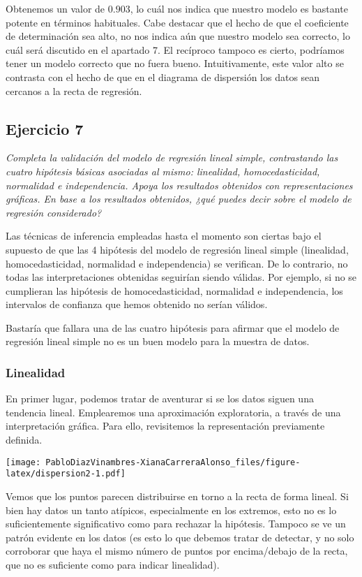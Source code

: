\documentclass[
]{article}
\begin{document}
Obtenemos un valor de \(0.903\), lo cuál nos indica que nuestro modelo
es bastante potente en términos habituales. Cabe destacar que el hecho
de que el coeficiente de determinación sea alto, no nos indica aún que
nuestro modelo sea correcto, lo cuál será discutido en el apartado 7. El
recíproco tampoco es cierto, podríamos tener un modelo correcto que no
fuera bueno. Intuitivamente, este valor alto se contrasta con el hecho
de que en el diagrama de dispersión los datos sean cercanos a la recta
de regresión.

\hypertarget{ejercicio-7}{%
\subsection{Ejercicio 7}\label{ejercicio-7}}

\textit{Completa la validación del modelo de regresión lineal simple, contrastando las cuatro hipótesis básicas asociadas al mismo: linealidad, homocedasticidad, normalidad e independencia. Apoya los resultados obtenidos con representaciones gráficas. En base a los resultados obtenidos, ¿qué puedes decir sobre el modelo de regresión considerado?}

Las técnicas de inferencia empleadas hasta el momento son ciertas bajo
el supuesto de que las 4 hipótesis del modelo de regresión lineal simple
(linealidad, homocedasticidad, normalidad e independencia) se verifican.
De lo contrario, no todas las interpretaciones obtenidas seguirían
siendo válidas. Por ejemplo, si no se cumplieran las hipótesis de
homocedasticidad, normalidad e independencia, los intervalos de
confianza que hemos obtenido no serían válidos.

Bastaría que fallara una de las cuatro hipótesis para afirmar que el
modelo de regresión lineal simple no es un buen modelo para la muestra
de datos.

\hypertarget{linealidad}{%
\subsubsection{Linealidad}\label{linealidad}}

En primer lugar, podemos tratar de aventurar si se los datos siguen una
tendencia lineal. Emplearemos una aproximación exploratoria, a través de
una interpretación gráfica. Para ello, revisitemos la representación
previamente definida.

\texttt{[image: PabloDiazVinambres-XianaCarreraAlonso\_files/figure-latex/dispersion2-1.pdf]}

Vemos que los puntos parecen distribuirse en torno a la recta de forma
lineal. Si bien hay datos un tanto atípicos, especialmente en los
extremos, esto no es lo suficientemente significativo como para rechazar
la hipótesis. Tampoco se ve un patrón evidente en los datos (es esto lo
que debemos tratar de detectar, y no solo corroborar que haya el mismo
número de puntos por encima/debajo de la recta, que no es suficiente
como para indicar linealidad).
\end{document}
